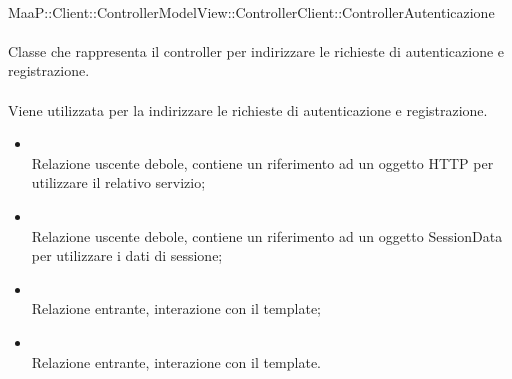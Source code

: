 \\
MaaP::Client::ControllerModelView::ControllerClient::ControllerAutenticazione\\
\\
Classe che rappresenta il controller per indirizzare le richieste di autenticazione e registrazione.\\
\\
Viene utilizzata per la indirizzare le richieste di autenticazione e registrazione.\\
\begin{itemize}
\item{}\\
Relazione uscente debole, contiene un riferimento ad un oggetto HTTP per utilizzare il relativo servizio;
\item{}\\
Relazione uscente debole, contiene un riferimento ad un oggetto SessionData per utilizzare i dati di sessione;
\item{}\\
Relazione entrante, interazione con il template;
\item{}\\
Relazione entrante, interazione con il template.
\end{itemize}

